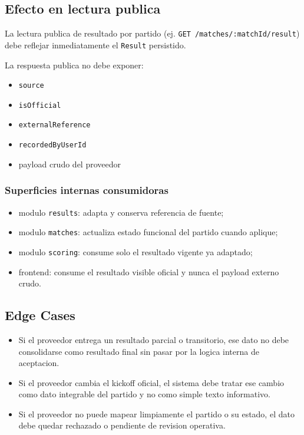 \subsection{Efecto en lectura publica}

La lectura publica de resultado por partido (ej. \texttt{GET /matches/:matchId/result}) debe reflejar inmediatamente el \texttt{Result} persistido.

La respuesta publica no debe exponer:
\begin{itemize}
  \item \texttt{source}
  \item \texttt{isOfficial}
  \item \texttt{externalReference}
  \item \texttt{recordedByUserId}
  \item payload crudo del proveedor
\end{itemize}

\subsubsection{Superficies internas consumidoras}

\begin{itemize}
  \item modulo \texttt{results}: adapta y conserva referencia de fuente;
  \item modulo \texttt{matches}: actualiza estado funcional del partido cuando aplique;
  \item modulo \texttt{scoring}: consume solo el resultado vigente ya adaptado;
  \item frontend: consume el resultado visible oficial y nunca el payload externo crudo.
\end{itemize}

\subsection{Edge Cases}

\begin{itemize}
  \item Si el proveedor entrega un resultado parcial o transitorio, ese dato no debe consolidarse como resultado final sin pasar por la logica interna de aceptacion.
  \item Si el proveedor cambia el kickoff oficial, el sistema debe tratar ese cambio como dato integrable del partido y no como simple texto informativo.
  \item Si el proveedor no puede mapear limpiamente el partido o su estado, el dato debe quedar rechazado o pendiente de revision operativa.
\end{itemize}

